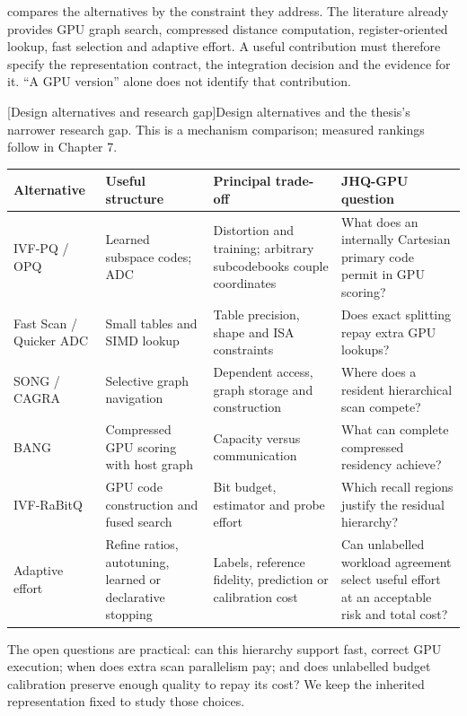  compares the alternatives by the constraint they
address. The literature already provides GPU graph search, compressed
distance computation, register-oriented lookup, fast selection and adaptive
effort. A useful contribution must therefore specify the representation
contract, the integration decision and the evidence for it. ``A GPU version''
alone does not identify that contribution.

\par\medskip\noindent\begin{minipage}{\linewidth}
\centering\captionsetup{hypcap=false}
[Design alternatives and research gap]{Design alternatives and the thesis's narrower research gap.
This is a mechanism comparison; measured rankings follow in Chapter 7.}
\label{tab:2-position}
\footnotesize\setlength{\tabcolsep}{4pt}
\begin{tabularx}{\linewidth}{@{}>{\raggedright\arraybackslash}p{.20\linewidth}*{3}{>{\raggedright\arraybackslash}X}@{}}
\toprule
Alternative & Useful structure & Principal trade-off & JHQ-GPU question \\
\midrule
IVF-PQ / OPQ & Learned subspace codes; ADC & Distortion and training;
arbitrary subcodebooks couple coordinates & What does an internally
Cartesian primary code permit in GPU scoring? \\
Fast Scan / Quicker ADC & Small tables and SIMD lookup & Table precision,
shape and ISA constraints & Does exact splitting repay extra GPU lookups? \\
SONG / CAGRA & Selective graph navigation & Dependent access, graph
storage and construction & Where does a resident hierarchical scan compete? \\
BANG & Compressed GPU scoring with host graph & Capacity versus
communication & What can complete compressed residency achieve? \\
IVF-RaBitQ & GPU code construction and fused search & Bit budget,
estimator and probe effort & Which recall regions justify the residual hierarchy? \\
Adaptive effort & Refine ratios, autotuning, learned or declarative stopping
& Labels, reference fidelity, prediction or calibration cost & Can unlabelled
workload agreement select useful effort at an acceptable risk and total cost? \\
\bottomrule
\end{tabularx}
\end{minipage}\par\medskip

The open questions are practical: can this hierarchy support fast, correct GPU execution; when does extra scan parallelism pay; and does unlabelled budget calibration preserve enough quality to repay its cost? We keep the inherited representation fixed to study those choices.

